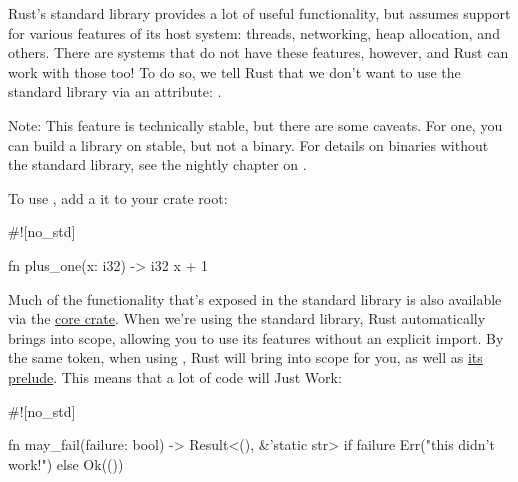 Rust's standard library provides a lot of useful functionality, but assumes support for various features of its host 
system: threads, networking, heap allocation, and others. There are systems that do not have these features, however, and 
Rust can work with those too! To do so, we tell Rust that we don't want to use the standard library via an attribute: 
\code{\#![no\_std]}.

\begin{myquote}
Note: This feature is technically stable, but there are some caveats. For one, you can build a \code{\#![no\_std]} library 
on stable, but not a binary. For details on binaries without the standard library, see the nightly chapter on 
\code{\#![no\_std]}.
\end{myquote}

To use \code{\#![no\_std]}, add a it to your crate root:

\begin{rustc}
#![no_std]

fn plus_one(x: i32) -> i32 {
    x + 1
}
\end{rustc}

Much of the functionality that's exposed in the standard library is also available via the 
\href{https://doc.rust-lang.org/core/}{core crate}. When we're using the standard library, Rust automatically brings 
 into scope, allowing you to use its features without an explicit import. By the same token, when using 
\code{!\#[no\_std]}, Rust will bring  into scope for you, as well as 
\href{https://doc.rust-lang.org/core/prelude/v1/}{its prelude}. This means that a lot of code will Just Work:

\begin{rustc}
#![no_std]

fn may_fail(failure: bool) -> Result<(), &'static str> {
    if failure {
        Err("this didn't work!")
    } else {
        Ok(())
    }
}
\end{rustc}

